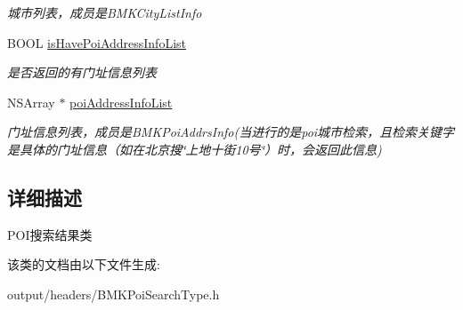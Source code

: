 \begin{DoxyCompactItemize}
\begin{DoxyCompactList}\small\item\em 城市列表，成员是\+B\+M\+K\+City\+List\+Info \end{DoxyCompactList}\item 
\hypertarget{interface_b_m_k_poi_result_a3ac82685d63e1e3453fe385737d9d481}{}B\+O\+O\+L \hyperlink{interface_b_m_k_poi_result_a3ac82685d63e1e3453fe385737d9d481}{is\+Have\+Poi\+Address\+Info\+List}\label{interface_b_m_k_poi_result_a3ac82685d63e1e3453fe385737d9d481}

\begin{DoxyCompactList}\small\item\em 是否返回的有门址信息列表 \end{DoxyCompactList}\item 
\hypertarget{interface_b_m_k_poi_result_a7e9b0cc577e6b1d92b34ea06202f64ac}{}N\+S\+Array $\ast$ \hyperlink{interface_b_m_k_poi_result_a7e9b0cc577e6b1d92b34ea06202f64ac}{poi\+Address\+Info\+List}\label{interface_b_m_k_poi_result_a7e9b0cc577e6b1d92b34ea06202f64ac}

\begin{DoxyCompactList}\small\item\em 门址信息列表，成员是\+B\+M\+K\+Poi\+Addrs\+Info(当进行的是poi城市检索，且检索关键字是具体的门址信息（如在北京搜\char`\"{}上地十街10号\char`\"{}）时，会返回此信息) \end{DoxyCompactList}\end{DoxyCompactItemize}


\subsection{详细描述}
P\+O\+I搜索结果类 

该类的文档由以下文件生成\+:\begin{DoxyCompactItemize}
\item 
output/headers/B\+M\+K\+Poi\+Search\+Type.\+h\end{DoxyCompactItemize}
